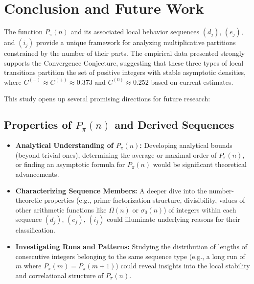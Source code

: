 \documentclass[]{article}
\theoremstyle{plain}%
\theoremstyle{definition}
\theoremstyle{remark}
\begin{document}
	\section{Conclusion and Future Work}
	\label{sec:conclusion}
	
	The function $P_{\pi}(n)$ and its associated local behavior sequences $(d_j)$, $(e_j)$, and $(i_j)$ provide a unique framework for analyzing multiplicative partitions constrained by the number of their parts. The empirical data presented strongly supports the Convergence Conjecture, suggesting that these three types of local transitions partition the set of positive integers with stable asymptotic densities, where $C^{(-)} \approx C^{(+)} \approx 0.373$ and $C^{(0)} \approx 0.252$ based on current estimates.
	
	This study opens up several promising directions for future research:
	
	\subsection{Properties of $P_{\pi}(n)$ and Derived Sequences}
	\begin{itemize}
		\item \textbf{Analytical Understanding of $P_{\pi}(n)$:} Developing analytical bounds (beyond trivial ones), determining the average or maximal order of $P_{\pi}(n)$, or finding an asymptotic formula for $P_{\pi}(n)$ would be significant theoretical advancements.
		\item \textbf{Characterizing Sequence Members:} A deeper dive into the number-theoretic properties (e.g., prime factorization structure, divisibility, values of other arithmetic functions like $\Omega(n)$ or $\sigma_0(n)$) of integers within each sequence $(d_j)$, $(e_j)$, $(i_j)$ could illuminate underlying reasons for their classification.
		\item \textbf{Investigating Runs and Patterns:} Studying the distribution of lengths of consecutive integers belonging to the same sequence type (e.g., a long run of $m$ where $P_{\pi}(m) = P_{\pi}(m+1)$) could reveal insights into the local stability and correlational structure of $P_{\pi}(n)$.
	\end{itemize}
	
\end{document}
